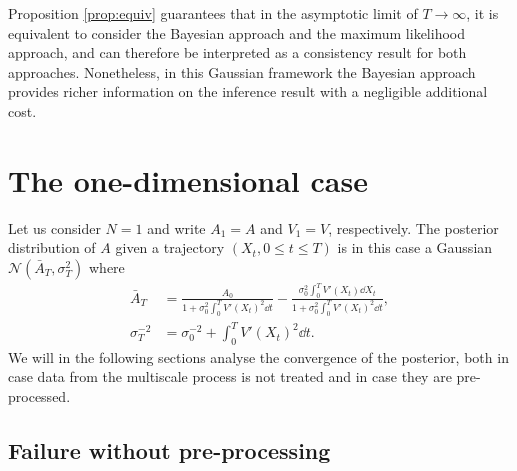 \documentclass[10pt]{article}
\begin{document}
\begin{remark} Proposition \ref{prop:equiv} guarantees that in the asymptotic limit of $T \to \infty$, it is equivalent to consider the Bayesian approach and the maximum likelihood approach, and can therefore be interpreted as a consistency result for both approaches. Nonetheless, in this Gaussian framework the Bayesian approach provides richer information on the inference result with a negligible additional cost.
\end{remark}

\section{The one-dimensional case}

Let us consider $N = 1$ and write $A_1 = A$ and $V_1 = V$, respectively. The posterior distribution of $A$ given a trajectory $(X_t, 0 \leq t \leq T)$ is in this case a Gaussian $\mathcal N(\bar A_T, \sigma^2_T)$ where
\begin{equation}
\begin{aligned}
	\bar A_T &= \frac{A_0}{1+\sigma_0^2\int_0^T V'(X_t)^2 \dd t} - \frac{\sigma_0^2\int_0^T  V'(X_t) \dd X_t}{1+\sigma_0^2\int_0^T V'(X_t)^2 \dd t}, \\
	\sigma^{-2}_T &= \sigma_0^{-2} + \int_0^T V'(X_t)^2 \dd t.
\end{aligned}
\end{equation}
We will in the following sections analyse the convergence of the posterior, both in case data from the multiscale process is not treated and in case they are pre-processed. 

\subsection{Failure without pre-processing}
\end{document}
